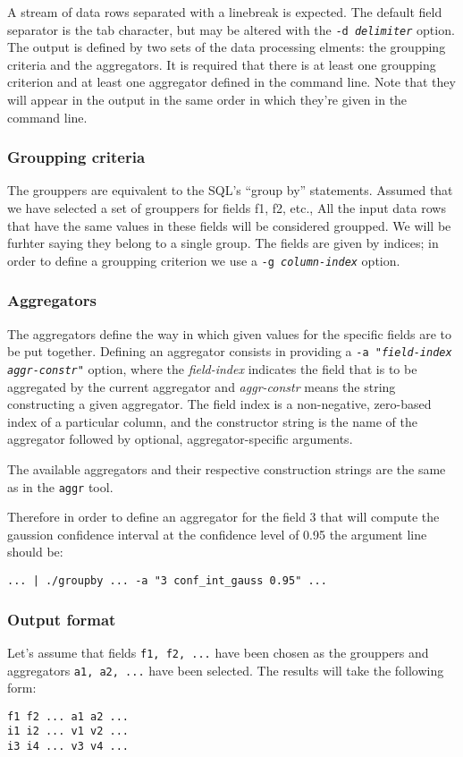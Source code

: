 \documentclass{report}
\begin{document}
A stream of data rows separated with a linebreak is expected. The default
field separator is the tab character, but may be altered with the
\texttt{-d \textit{delimiter}} option. The output is defined by two sets
of the data processing elments: the groupping criteria and the aggregators.
It is required that there is at least one groupping criterion and at least one
aggregator defined in the command line. Note that they will appear in the output
in the same order in which they're given in the command line.

\subsubsection{Groupping criteria}
The grouppers are equivalent to the SQL's ``group by'' statements.
Assumed that we have selected a set of grouppers for fields f1, f2, etc.,
All the input data rows that have the same values in these fields will be
considered groupped. We will be furhter saying they belong to a single group.
The fields are given by indices; in order to define a groupping criterion we use
a \texttt{-g \textit{column-index}} option.

\subsubsection{Aggregators}
The aggregators define the way in which given values for the specific fields
are to be put together. Defining an aggregator consists in providing a
\texttt{-a "\textit{field-index} \textit{aggr-constr}"} option, where the
\textit{field-index} indicates the field that is to be aggregated by the
current aggregator and \textit{aggr-constr} means the string constructing
a given aggregator. The field index is a non-negative, zero-based index
of a particular column, and the constructor string is the name of the
aggregator followed by optional, aggregator-specific arguments.

The available aggregators and their respective construction strings are
the same as in the \texttt{aggr} tool.

Therefore in order to define an aggregator for the field 3 that will compute
the gaussion confidence interval at the confidence level of 0.95 the argument
line should be:

\texttt{... | ./groupby ... -a "3 conf\_int\_gauss 0.95" ...}

\subsubsection{Output format}
Let's assume that fields \texttt{f1, f2, ...} have been chosen as the
grouppers and aggregators \texttt{a1, a2, ...} have been selected.
The results will take the following form:
\begin{verbatim}
f1 f2 ... a1 a2 ...
i1 i2 ... v1 v2 ...
i3 i4 ... v3 v4 ...
\end{verbatim}
\end{document}

